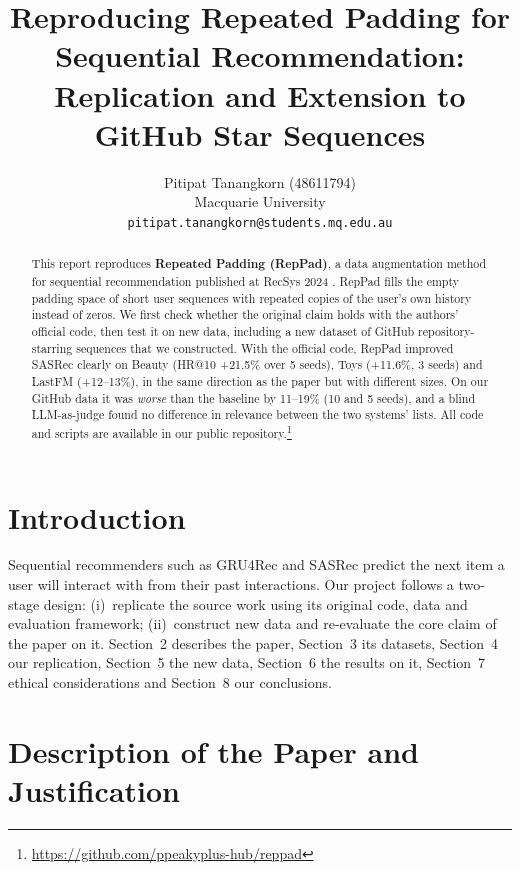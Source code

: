 \documentclass[11pt]{article}
\title{Reproducing Repeated Padding for Sequential Recommendation:\\
Replication and Extension to GitHub Star Sequences}
\author{
  Pitipat Tanangkorn (48611794) \\
  Macquarie University \\
  \texttt{pitipat.tanangkorn@students.mq.edu.au}
}
\begin{document}
\maketitle

\begin{abstract}
This report reproduces \textbf{Repeated Padding (RepPad)}, a data augmentation
method for sequential recommendation published at RecSys 2024
\citep{dang2024repeated}. RepPad fills the empty padding space of short user
sequences with repeated copies of the user's own history instead of zeros. We
first check whether the original claim holds with the authors' official code,
then test it on new data, including a new dataset of GitHub repository-starring
sequences that we constructed. With the official code, RepPad improved SASRec clearly on Beauty (HR@10 +21.5\% over 5 seeds), Toys (+11.6\%, 3 seeds) and LastFM (+12--13\%), in the same direction as the paper but with different sizes. On our GitHub data it was \emph{worse} than the baseline by 11--19\% (10 and 5 seeds), and a blind LLM-as-judge found no difference in relevance between the two systems' lists.
All code and scripts are available in our public repository.\footnote{\url{https://github.com/ppeakyplus-hub/reppad}}
\end{abstract}

\section{Introduction}

Sequential recommenders such as GRU4Rec and SASRec predict the next item a user
will interact with from their past interactions. Our project follows a
two-stage design: (i)~replicate the source work using its original code, data and
evaluation framework; (ii)~construct new data and re-evaluate the core claim of
the paper on it. Section~2 describes the paper, Section~3 its datasets, Section~4 our replication, Section~5 the new data, Section~6 the results on it, Section~7 ethical considerations and Section~8 our conclusions.

\section{Description of the Paper and Justification}
\end{document}
